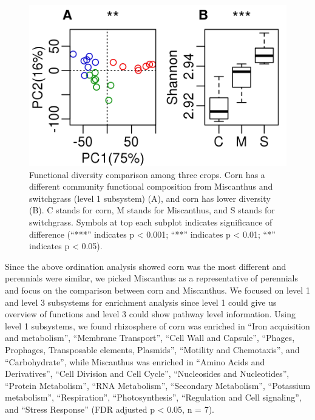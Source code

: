 \documentclass[]{msu-thesis}
\begin{document}
\begin{figure}[tbph!]
  \centering
  \includegraphics[scale=1]{figs/chap4-subsys-L1-pca-shannon}
  \caption[Functional diversity of three crops using subsystem level 1 ]{Functional diversity comparison among three crops. Corn has a different community functional composition from Miscanthus and switchgrass (level 1 subsystem) (A), and corn has lower diversity (B). C stands for corn, M stands for Miscanthus, and S stands for switchgrass. Symbols at top each subplot indicates significance of difference (``***'' indicates p < 0.001; ``**'' indicates p < 0.01; ``*'' indicates p < 0.05).}
  \label{fig:chap4FigS4}
\end{figure}


Since the above ordination analysis showed corn was the most different and perennials were similar, we picked Miscanthus as a representative of perennials and focus on the comparison between corn and Miscanthus. We focused on level 1 and level 3 subsystems for enrichment analysis since level 1 could give us overview of functions and level 3 could show pathway level information. Using level 1 subsystems, we found rhizosphere of corn was enriched in ``Iron acquisition and metabolism'', ``Membrane Transport'', ``Cell Wall and Capsule'', ``Phages, Prophages, Transposable elements, Plasmids'', ``Motility and Chemotaxis'', and ``Carbohydrate'', while Miscanthus was enriched in ``Amino Acids and Derivatives'', ``Cell Division and Cell Cycle'', ``Nucleosides and Nucleotides'', ``Protein Metabolism'', ``RNA Metabolism'', ``Secondary Metabolism'', ``Potassium metabolism'', ``Respiration'', ``Photosynthesis'', ``Regulation and Cell signaling'', and ``Stress Response'' (FDR adjusted p < 0.05, n = 7).
\end{document}

